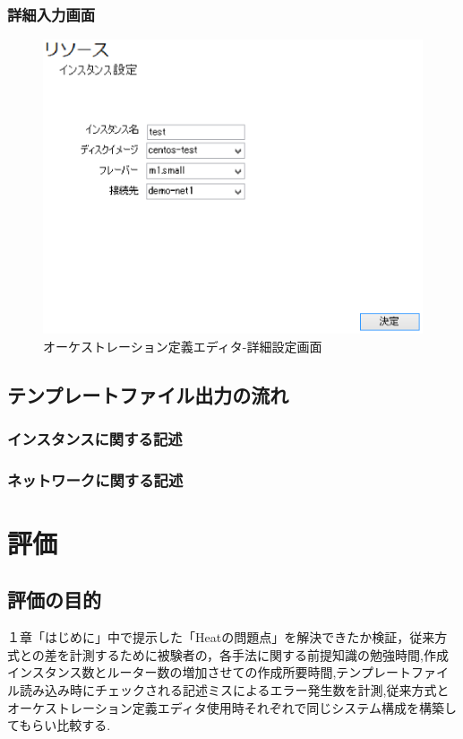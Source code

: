 \documentclass[mingoth]{kut-paper}		%
\begin{document}
		\subsection{詳細入力画面}
			\begin{figure}[H]
				\begin{center}
					\includegraphics[scale=0.5]{Document/詳細設定画面.eps}
					\caption{オーケストレーション定義エディタ-詳細設定画面}
					\label{pic:4}
				\end{center}
			\end{figure}
	\section{テンプレートファイル出力の流れ}
		\subsection{インスタンスに関する記述}
		
		\subsection{ネットワークに関する記述}
		
\chapter{評価}
	\section{評価の目的}
	１章「はじめに」中で提示した「Heatの問題点」を解決できたか検証，従来方式との差を計測するために被験者の，各手法に関する前提知識の勉強時間,作成インスタンス数とルーター数の増加させての作成所要時間,テンプレートファイル読み込み時にチェックされる記述ミスによるエラー発生数を計測,従来方式とオーケストレーション定義エディタ使用時それぞれで同じシステム構成を構築してもらい比較する.
\end{document}
